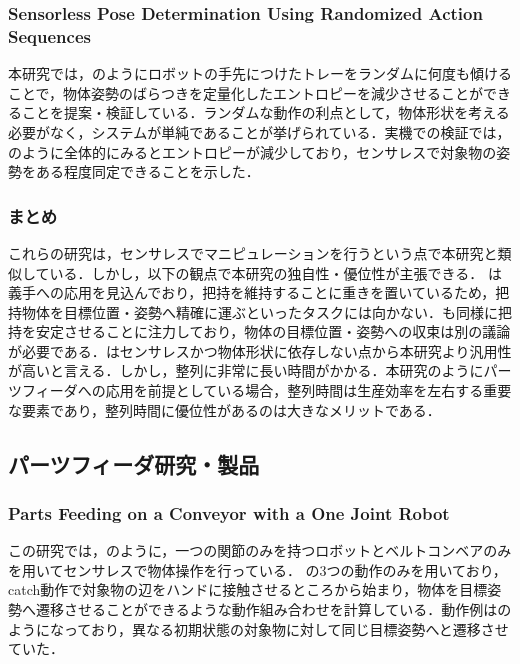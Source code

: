 \documentclass[a4paper,twoside,12pt,papersize, dvipdfmx]{iirthesis}
\begin{document}
\subsubsection{Sensorless Pose Determination Using  Randomized Action Sequences ~\cite{mannam2019}}
本研究では，のようにロボットの手先につけたトレーをランダムに何度も傾けることで，物体姿勢のばらつきを定量化したエントロピーを減少させることができることを提案・検証している．ランダムな動作の利点として，物体形状を考える必要がなく，システムが単純であることが挙げられている．実機での検証では，のように全体的にみるとエントロピーが減少しており，センサレスで対象物の姿勢をある程度同定できることを示した．

\subsubsection{まとめ}
これらの研究は，センサレスでマニピュレーションを行うという点で本研究と類似している．しかし，以下の観点で本研究の独自性・優位性が主張できる．
\cite{ospina2020}は義手への応用を見込んでおり，把持を維持することに重きを置いているため，把持物体を目標位置・姿勢へ精確に運ぶといったタスクには向かない．\cite{tahara2013}\cite{tahara2020}も同様に把持を安定させることに注力しており，物体の目標位置・姿勢への収束は別の議論が必要である．\cite{mannam2019}はセンサレスかつ物体形状に依存しない点から本研究より汎用性が高いと言える．しかし，整列に非常に長い時間がかかる．本研究のようにパーツフィーダへの応用を前提としている場合，整列時間は生産効率を左右する重要な要素であり，整列時間に優位性があるのは大きなメリットである．


\subsection{パーツフィーダ研究・製品}

\subsubsection{Parts Feeding on a Conveyor with a One Joint Robot \cite{akella2000}}
この研究では，のように，一つの関節のみを持つロボットとベルトコンベアのみを用いてセンサレスで物体操作を行っている．
の3つの動作のみを用いており，catch動作で対象物の辺をハンドに接触させるところから始まり，物体を目標姿勢へ遷移させることができるような動作組み合わせを計算している．動作例はのようになっており，異なる初期状態の対象物に対して同じ目標姿勢へと遷移させていた．
\end{document}
